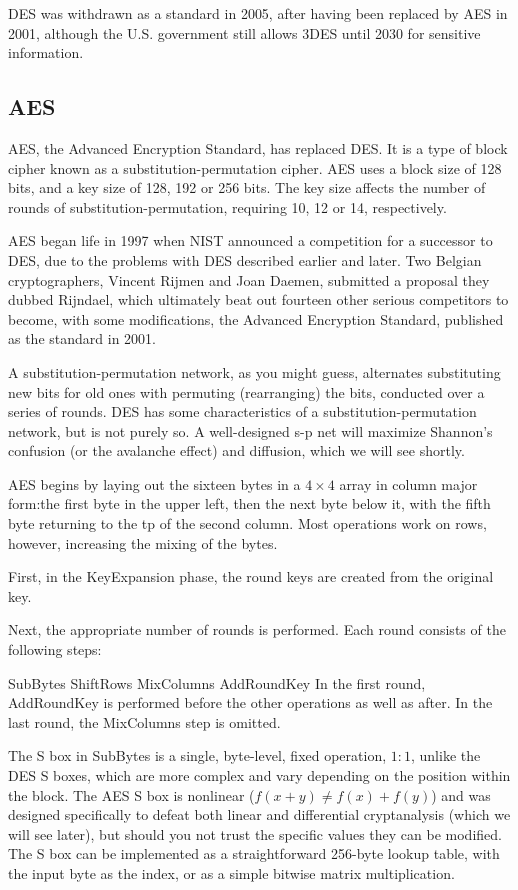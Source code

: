 \documentclass[%
 aip,
 jmp,%
 amsmath,amssymb,
 reprint,%
]{revtex4-1}
\begin{document}
DES was withdrawn as a standard in 2005, after having been replaced by
AES in 2001, although the U.S. government still allows 3DES until 2030
for sensitive information.

\subsection{AES}

AES, the Advanced Encryption Standard, has replaced DES.  It is a type of block cipher known as a substitution-permutation cipher.  AES uses a block size of 128 bits, and a key size of 128, 192 or 256 bits. The key size affects the number of rounds of substitution-permutation, requiring 10, 12 or 14, respectively.

AES began life in 1997 when NIST announced a competition for a successor to DES, due to the problems with DES described earlier and later. Two Belgian cryptographers, Vincent Rijmen and Joan Daemen, submitted a proposal they dubbed Rijndael, which ultimately beat out fourteen other serious competitors to become, with some modifications, the Advanced Encryption Standard, published as the standard in 2001.

A substitution-permutation network, as you might guess, alternates substituting new bits for old ones with permuting (rearranging) the bits, conducted over a series of rounds. DES has some characteristics of a substitution-permutation network, but is not purely so. A well-designed s-p net will maximize Shannon's confusion (or the avalanche effect) and diffusion, which we will see shortly.

AES begins by laying out the sixteen bytes in a $4\times 4$ array in column major form:the first byte in the upper left, then the next byte below it, with the fifth byte returning to the tp of the second column. Most operations work on rows, however, increasing the mixing of the bytes.

First, in the KeyExpansion phase, the round keys are created from the original key.

Next, the appropriate number of rounds is performed. Each round consists of the following steps:

SubBytes
ShiftRows
MixColumns
AddRoundKey
In the first round, AddRoundKey is performed before the other operations as well as after. In the last round, the MixColumns step is omitted.

The S box in SubBytes is a single, byte-level, fixed operation, $1:1$, unlike the DES S boxes, which are more complex and vary depending on the position within the block. The AES S box is nonlinear ($f(x+y) \ne f(x)+f(y)$) and was designed specifically to defeat both linear and differential cryptanalysis (which we will see later), but should you not trust the specific values they can be modified. The S box can be implemented as a straightforward 256-byte lookup table, with the input byte as the index, or as a simple bitwise matrix multiplication.
\end{document}
